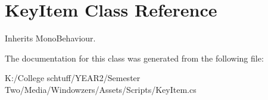\hypertarget{class_key_item}{}\section{Key\+Item Class Reference}
\label{class_key_item}


Inherits Mono\+Behaviour.



The documentation for this class was generated from the following file\+:\begin{DoxyCompactItemize}
\item 
K\+:/\+College schtuff/\+Y\+E\+A\+R2/\+Semester Two/\+Media/\+Windowzers/\+Assets/\+Scripts/Key\+Item.\+cs\end{DoxyCompactItemize}
